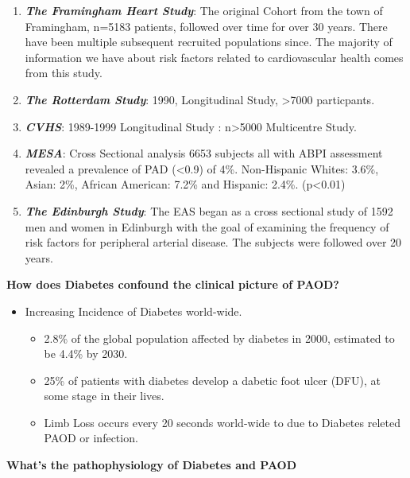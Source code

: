 \documentclass[
]{book}
\begin{document}
\begin{enumerate}
\def\labelenumi{\arabic{enumi}.}
\item
  \textbf{\emph{The Framingham Heart Study}}: The original Cohort from the town of
  Framingham, n=5183 patients, followed over time for over 30 years.
  There have been multiple subsequent recruited populations since. The
  majority of information we have about risk factors related to
  cardiovascular health comes from this study.
  \citep{mahmoodFraminghamHeartStudy2014}
\item
  \textbf{\emph{The Rotterdam Study}}: 1990, Longitudinal Study, \textgreater7000 particpants.
\item
  \textbf{\emph{CVHS}}: 1989-1999 Longitudinal Study : n\textgreater5000 Multicentre Study.
\item
  \textbf{\emph{MESA}}: Cross Sectional analysis 6653 subjects all with ABPI
  assessment revealed a prevalence of PAD (\textless0.9) of 4\%. Non-Hispanic
  Whites: 3.6\%, Asian: 2\%, African American: 7.2\% and Hispanic: 2.4\%.
  (p\textless0.01) \citep{allisonEffectNovelCardiovascular2006}
\item
  \textbf{\emph{The Edinburgh Study}}: The EAS began as a cross sectional study of
  1592 men and women in Edinburgh with the goal of examining the
  frequency of risk factors for peripheral arterial disease. The
  subjects were followed over 20 years.
  \citep{fowkesEdinburghArteryStudy1991}
\end{enumerate}

\textbf{How does Diabetes confound the clinical picture of PAOD?}

\begin{itemize}
\item
  Increasing Incidence of Diabetes world-wide.
  \citep{boultonGlobalBurdenDiabetic2005}

  \begin{itemize}
  \item
    2.8\% of the global population affected by diabetes in 2000,
    estimated to be 4.4\% by 2030.
  \item
    25\% of patients with diabetes develop a dabetic foot ulcer (DFU),
    at some stage in their lives.
  \item
    Limb Loss occurs every 20 seconds world-wide to due to Diabetes
    releted PAOD or infection.
  \end{itemize}
\end{itemize}

\textbf{What's the pathophysiology of Diabetes and PAOD}
\citep{armstrong26PathophysiologyPrinciplesManagement2012}
\end{document}
